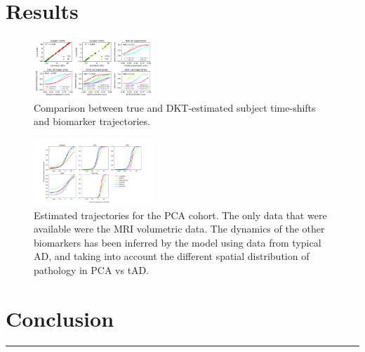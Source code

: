 \documentclass[portrait,a0,final,19pt]{a0poster}
\begin{document}
\begin{multicols}{2}
\section*{Results}


\begin{figure}[H]
\includegraphics[width=0.4\textwidth]{../figures/compTrueParams105_synth1_JMD.pdf}
\caption[DKT Simulation Results - Comparison between true and DKT-estimated biomarker trajectories and subject time-shifts.]{Comparison between true and DKT-estimated subject time-shifts and biomarker trajectories.}
  \label{fig:dktSynthTrajCompTrue}
\end{figure}

\begin{figure}[H]
\centering
 \includegraphics[width=0.4\textwidth, trim=0 20 0 0, clip]{../figures/trajDisSpaceOverlap_PCA_tad-drcTinyPen5_JMD.png}
 \caption{Estimated trajectories for the PCA cohort. The only data that were available were the MRI volumetric data. The dynamics of the other biomarkers has been inferred by the model using data from typical AD, and taking into account the different spatial distribution of pathology in PCA vs tAD. }
 \label{fig:PCAtrajByModality}
\end{figure}




\section*{Conclusion}






\end{multicols}
\hrule
\end{document}
